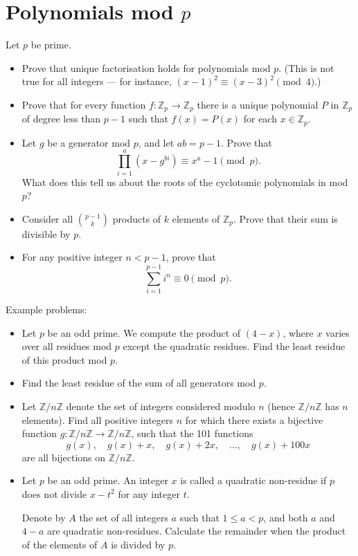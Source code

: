 \documentclass{article}
\newcommand\Zz{\mathbb{Z}}
\begin{document}
\section{Polynomials mod $p$}
Let $p$ be prime.
\begin{itemize}
  \item Prove that unique factorisation holds for polynomials mod $p$. (This is
    not true for all integers --- for instance,
    $(x-1)^2\equiv(x-3)^2\pmod 4$.)
  \item Prove that for every function $f:\Zz_p\to\Zz_p$ there is a unique polynomial $P$ in
    $\Zz_p$ of degree less than $p-1$ such that $f(x)=P(x)$ for each
    $x\in\Zz_p$.
  \item Let $g$ be a generator mod $p$, and let $ab=p-1$. Prove that
    \[\prod_{i=1}^a (x-g^{bi})\equiv x^a-1\pmod p.\]
    What does this tell us about the roots of the cyclotomic polynomials in mod
    $p$?
  \item Consider all $\binom{p-1}k$ products of $k$ elements of $\Zz_p$. Prove
    that their sum is divisible by $p$.
  \item For any positive integer $n<p-1$, prove that
    \[\sum_{i=1}^{p-1} i^n\equiv 0\pmod p.\]
\end{itemize}
Example problems:
\begin{itemize}
  \item Let $p$ be an odd prime. We compute the product of $(4-x)$,
    where $x$ varies over all residues mod $p$ except the quadratic residues.
    Find the least residue of this product mod $p$.
  \item Find the least residue of the sum of all generators mod $p$.
  \item Let $\mathbb{Z}/n\mathbb{Z}$ denote the set of integers considered
    modulo $n$ (hence $\mathbb{Z}/n\mathbb{Z}$ has $n$ elements). Find all
    positive integers $n$ for which there exists a bijective function $g:
    \mathbb{Z}/n\mathbb{Z} \to \mathbb{Z}/n\mathbb{Z}$, such that the 101
    functions
    \[g(x), \quad g(x) + x, \quad g(x) + 2x, \quad \dots, \quad g(x) + 100x\]are
    all bijections on $\mathbb{Z}/n\mathbb{Z}$.
  \item Let $p$ be an odd prime. An integer $x$ is called a quadratic
    non-residue if $p$ does not divide $x-t^2$ for any integer $t$.

    Denote by $A$ the set of all integers $a$ such that $1\le a<p$, and both $a$
    and $4-a$ are quadratic non-residues. Calculate the remainder when the
    product of the elements of $A$ is divided by $p$.
\end{itemize}
\end{document}
